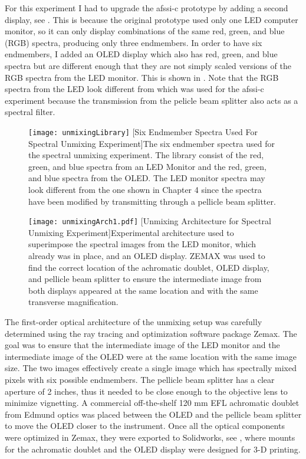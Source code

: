 For this experiment I had to upgrade the \gls{afssi-c} prototype by adding a second display, see . This is because the original prototype used only one LED computer monitor, so it can only display combinations of the same red, green, and blue (RGB) spectra, producing only three endmembers. In order to have six endmembers, I added an OLED display which also has red, green, and blue spectra but are different enough that they are not simply scaled versions of the RGB spectra from the LED monitor. This is shown in . Note that the RGB spectra from the LED look different from  which was used for the \gls{afssi-c} experiment because the transmission from the pelicle beam splitter also acts as a spectral filter. 

\begin{figure}
	\centering
	\texttt{[image: unmixingLibrary]}
	[Six Endmember Spectra Used For Spectral Unmixing Experiment]{The six endmember spectra used for the spectral unmixing experiment. The library consist of the red, green, and blue spectra from an LED Monitor and the red, green, and blue spectra from the OLED. The LED monitor spectra may look different from the one shown in Chapter 4 since the spectra have been modified by transmitting through a pellicle beam splitter. }
	\label{fig:unmixingLibrary}
\end{figure}

\begin{figure}
	\centering
	\texttt{[image: unmixingArch1.pdf]}
	[Unmixing Architecture for Spectral Unmixing Experiment]{Experimental architecture used to superimpose the spectral images from the LED monitor, which already was in place, and an OLED display. ZEMAX was used to find the correct location of the achromatic doublet, OLED display, and pellicle beam splitter to ensure the intermediate image from both displays appeared at the same location and with the same transverse magnification.}
	\label{fig:unmixingArch1}
\end{figure}

The first-order optical architecture of the unmixing setup was carefully determined using the ray tracing and optimization software package Zemax. The goal was to ensure that the intermediate image of the LED monitor and the intermediate image of the OLED were at the same location with the same image size. The two images effectively create a single image which has spectrally mixed pixels with six possible endmembers. The pellicle beam splitter has a clear aperture of 2 inches, thus it needed to be close enough to the objective lens to minimize vignetting. A commercial off-the-shelf 120 mm EFL achromatic doublet from Edmund optics was placed between the OLED and the pellicle beam splitter to move the OLED closer to the instrument. Once all the optical components were optimized in Zemax, they were exported to Solidworks, see , where mounts for the achromatic doublet and the OLED display were designed for 3-D printing. 

